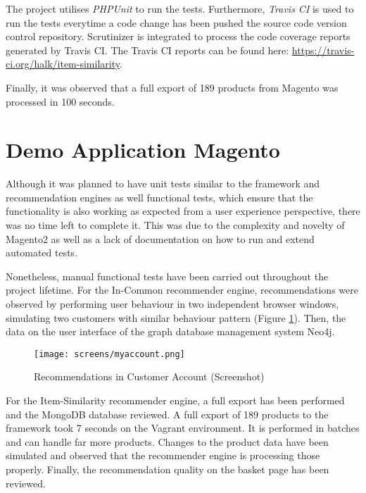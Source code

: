 The project utilises \emph{PHPUnit} to run the tests. Furthermore, \emph{Travis CI} is used to run the tests everytime a code change has been pushed the source code version control repository. Scrutinizer is integrated to process the code coverage reports generated by Travis CI. The Travis CI reports can be found here: \url{https://travis-ci.org/halk/item-similarity}.

Finally, it was observed that a full export of 189 products from Magento was processed in 100 seconds.

\section{Demo Application Magento}

Although it was planned to have unit tests similar to the framework and recommendation engines as well functional tests, which ensure that the functionality is also working as expected from a user experience perspective, there was no time left to complete it. This was due to the complexity and novelty of Magento2 as well as a lack of documentation on how to run and extend automated tests.

Nonetheless, manual functional tests have been carried out throughout the project lifetime. For the In-Common recommender engine, recommendations were observed by performing user behaviour in two independent browser windows, simulating two customers with similar behaviour pattern (Figure \ref{fig:testing-magento-myaccount}). Then, the data on the user interface of the graph database management system Neo4j.

\begin{figure}[!ht]
    \texttt{[image: screens/myaccount.png]}
    \caption{Recommendations in Customer Account (Screenshot)}
    \label{fig:testing-magento-myaccount}
\end{figure}

For the Item-Similarity recommender engine, a full export has been performed and the MongoDB database reviewed. A full export of 189 products to the framework took 7 seconds on the Vagrant environment. It is performed in batches and can handle far more products. Changes to the product data have been simulated and observed that the recommender engine is processing those properly. Finally, the recommendation quality on the basket page has been reviewed.